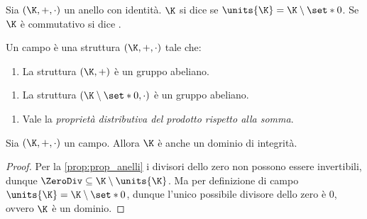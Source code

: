 \begin{definition}
    Sia $(\K, +, \cdot)$ un anello con identità.  $\K$ si dice  se $\units{\K} = \K \setminus \set*{0}$. Se $\K$ è commutativo si dice .
\end{definition}

\begin{remark}
    Un campo è una struttura $(\K, +, \cdot)$ tale che: 
    \begin{enumerate}[label={(S)}]
        \item La struttura $(\K, +)$ è un gruppo abeliano.
    \end{enumerate}
    \begin{enumerate}[label={(P)}]
        \item La struttura $(\K\setminus \set*{0}, \cdot)$ è un gruppo abeliano.
    \end{enumerate}
    \begin{enumerate}[label=(D)]
        \item \label{def:campo:distr} Vale la \emph{proprietà distributiva del prodotto rispetto alla somma}.
    \end{enumerate}
\end{remark}

\begin{proposition}
     Sia $(\K, +, \cdot)$ un campo. Allora $\K$ è anche un dominio di integrità.
\end{proposition}
\begin{proof}
    Per la \autoref{prop:prop_anelli} i divisori dello zero non possono essere invertibili, dunque $\ZeroDiv \subseteq \K \setminus \units{\K}$. Ma per definizione di campo $\units{\K} = \K \setminus \set*{0}$, dunque l'unico possibile divisore dello zero è $0$, ovvero $\K$ è un dominio.
\end{proof}

